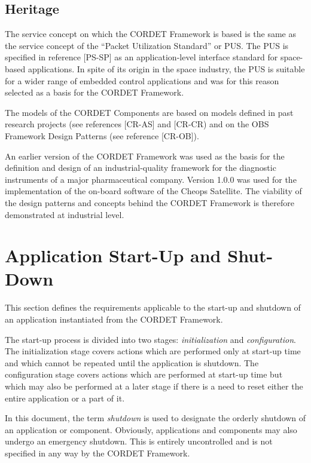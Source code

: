 \documentclass{pnp_article}
\begin{document}
\subsection{Heritage}\label{sec:Heritage}
The service concept on which the CORDET Framework is based is the same as the service concept of the “Packet Utilization Standard” or PUS. 
The PUS is specified in reference [PS-SP] as an application-level interface standard for space-based applications. 
In spite of its origin in the space industry, the PUS is suitable for a wider range of embedded control applications and was for this reason selected as a basis for the CORDET Framework. 

The models of the CORDET Components are based on models defined in past research projects (see references [CR-AS] and [CR-CR) and on the OBS Framework Design Patterns (see reference [CR-OB]). 

An earlier version of the CORDET Framework was used as the basis for the definition and design of an industrial-quality framework for the diagnostic instruments of a major pharmaceutical company. Version 1.0.0 was used for the implementation of the on-board software of the Cheops Satellite. The viability of the design patterns and concepts behind the CORDET Framework is therefore demonstrated at industrial level. 

\section{Application Start-Up and Shut-Down}\label{sec:AppStartUpAndShutdown}

This section defines the requirements applicable to the start-up and shutdown of an application instantiated from the CORDET Framework.

The start-up process is divided into two stages: \textit{initialization} and \textit{configuration}. The initialization stage covers actions which are performed only at start-up time and which cannot be repeated until the application is shutdown. The configuration stage covers actions which are performed at start-up time but which may also be performed at a later stage if there is a need to reset either the entire application or a part of it. 

In this document, the term \textit{shutdown} is used to designate the orderly shutdown of an application or component. Obviously, applications and components may also undergo an emergency shutdown. This is entirely uncontrolled and is not specified in any way by the CORDET Framework.
\end{document}
